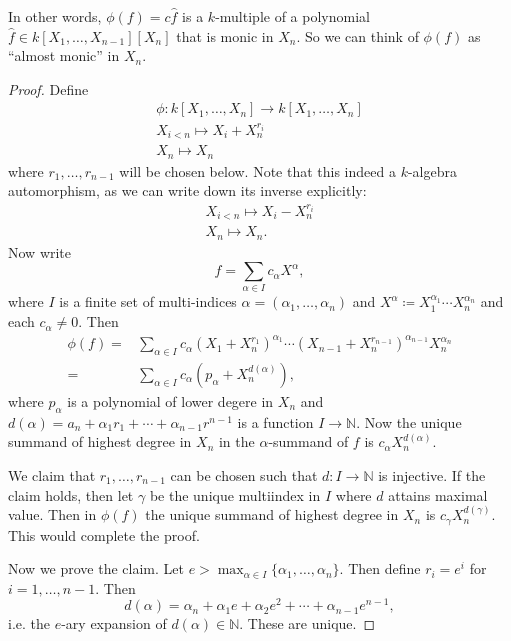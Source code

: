 \documentclass[12pt]{article}
\begin{document}
\begin{remark}
	In other words, $\phi(f)=c\hat{f}$ is a $k$-multiple of a polynomial $\hat{f}\in k[X_1,\dots,X_{n-1}][X_n]$ that is monic in $X_n$. So we can think of $\phi(f)$ as ``almost monic'' in $X_n$.
\end{remark}

\begin{proof}
	Define 
	\begin{gather*}
		\phi:k[X_1,\dots,X_n]\to k[X_1,\dots,X_n] \\
		X_{i<n} \mapsto X_i + X_n^{r_i} \\
		X_n \mapsto X_n
	\end{gather*}
	where $r_1,\dots,r_{n-1}$ will be chosen below. Note that this indeed a $k$-algebra automorphism, as we can write down its inverse explicitly:
	\begin{gather*}
		X_{i<n} \mapsto X_i - X_n^{r_i} \\
		X_n \mapsto X_n.
	\end{gather*}
	Now write 
	\begin{equation*}
		f=\sum_{\alpha\in I}c_\alpha X^\alpha,
	\end{equation*}
	where $I$ is a finite set of multi-indices $\alpha=(\alpha_1,\dots,\alpha_n)$ and $X^\alpha\coloneqq X_1^{\alpha_1}\cdots X_n^{\alpha_n}$ and each $c_\alpha\neq 0$. Then 
	\begin{align*}
		\phi(f) =& \sum_{\alpha\in I}c_\alpha(X_1+X_n^{r_1})^{\alpha_1}\cdots (X_{n-1}+X_n^{r_{n-1}})^{\alpha_{n-1}}X_n^{\alpha_n} \\
		=& \sum_{\alpha\in I} c_\alpha(p_\alpha + X_n^{d(\alpha)}),
	\end{align*}
	where $p_\alpha$ is a polynomial of lower degere in $X_n$ and $d(\alpha)=a_n+\alpha_1r_1+\cdots+\alpha_{n-1}r^{n-1}$ is a function $I\to \mathbb{N}$. Now the unique summand of highest degree in $X_n$ in the $\alpha$-summand of $f$ is $c_\alpha X^{d(\alpha)}_n$.

	We claim that $r_1,\dots,r_{n-1}$ can be chosen such that $d:I\to\mathbb{N}$ is injective. If the claim holds, then let $\gamma$ be the unique multiindex in $I$ where $d$ attains maximal value. Then in $\phi(f)$ the unique summand of highest degree in $X_n$ is $c_\gamma X_n^{d(\gamma)}$. This would complete the proof.

	Now we prove the claim. Let $e>\max_{\alpha\in I}\{\alpha_1,\dots,\alpha_n\}$. Then define $r_i=e^i$ for $i=1,\dots,n-1$. Then 
	\begin{equation*}
		d(\alpha) = \alpha_n + \alpha_1e + \alpha_2e^2 + \cdots + \alpha_{n-1}e^{n-1},
	\end{equation*}
	i.e. the $e$-ary expansion of $d(\alpha)\in\mathbb{N}$. These are unique.
\end{proof}
\end{document}
